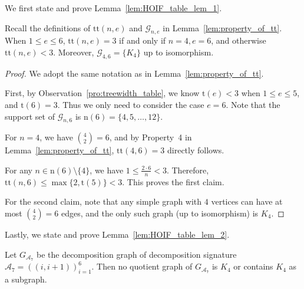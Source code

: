 \documentclass[twoside,11pt]{article}
\newcommand{\graphset}{\mathcal{G}}
\newcommand{\graphsetne}[2]{\graphset_{#1,#2}}
\newcommand{\completegraphp}[1]{K_{#1}}
\newcommand{\graphform}[1]{G_{#1}}
\def\calA{\mathcal{A}}
\begin{document}
We first state and prove Lemma~\ref{lem:HOIF_table_lem_1}.
\begin{lemma}
\label{lem:HOIF_table_lem_1}
Recall the definitions of $\mathrm{tt}(n, e)$ and $\graphsetne{n}{e}$ in Lemma~\ref{lem:property_of_tt}. When $1\le e \le  6$, $\mathrm{tt}(n, e) = 3$ if and only if $n = 4, e = 6$, and otherwise $\mathrm{tt}(n, e) < 3$. Moreover, $\graphsetne{4}{6} = \{\completegraphp{4}\}$ up to isomorphism.
\end{lemma}

\begin{proof}
We adopt the same notation as in Lemma~\ref{lem:property_of_tt}.

First, by Observation~\ref{pro:treewidth_table}, we know $\mathrm{t} (e) < 3$ when $1 \le e \le 5$, and $\mathrm{t}(6) = 3$. Thus we only need to consider the case $e = 6$. Note that the support set of $\graphsetne{n}{6}$ is $\mathrm{n}(6) = \{4,5,\dots,12\}$.
    
For $n = 4$, we have $\binom{4}{2} = 6$, and by Property~4 in Lemma~\ref{lem:property_of_tt}, $\mathrm{tt}(4, 6) = 3$ directly follows.  
    
For any $n \in \mathrm{n}(6) \setminus \{4\}$, we have $1 \le \frac{2 \cdot 6}{n} < 3$.  Therefore, $\mathrm{tt}(n, 6) \le \max\{ 2, \mathrm{t}(5) \} < 3$. This proves the first claim.
    
For the second claim, note that any simple graph with $4$ vertices can have at most $\binom{4}{2} = 6$ edges, and the only such graph (up to isomorphism) is $\completegraphp{4}$. 
\end{proof}

Lastly, we state and prove Lemma~\ref{lem:HOIF_table_lem_2}.

\begin{lemma}
\label{lem:HOIF_table_lem_2}
Let $\graphform{\calA_7}$ be the decomposition graph of decomposition signature $\calA_7 = ((i,i+1))_{i=1}^6$. Then no quotient graph of $\graphform{\calA_7}$ is $\completegraphp{4}$ or contains $\completegraphp{4}$ as a subgraph.
\end{lemma}
\end{document}
